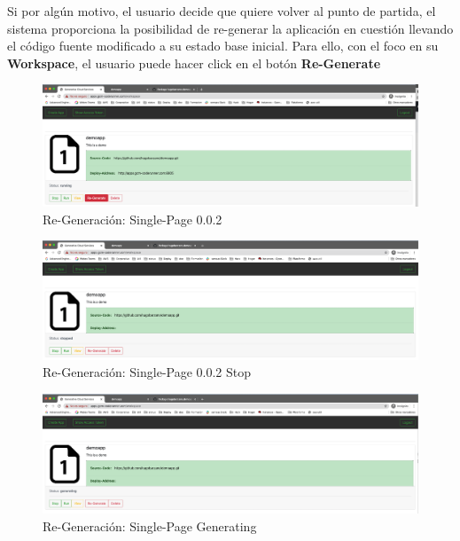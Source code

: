 \documentclass[a4paper,11pt]{book}
\begin{document}
Si por algún motivo, el usuario decide que quiere volver al punto de partida, el sistema proporciona la posibilidad de re-generar la aplicación en cuestión llevando el código fuente modificado a su estado base inicial. Para ello, con el foco en su \textbf{Workspace}, el usuario puede hacer click en el botón \textbf{Re-Generate}

 \begin{figure}[H]
\centering
\includegraphics[scale=0.25]{imagenes/casouso/4_1_a.png}
\caption{  Re-Generación: Single-Page 0.0.2 }
\end{figure}


\begin{figure}[H]
\centering
\includegraphics[scale=0.25]{imagenes/casouso/4_2_a.png}
\caption{  Re-Generación: Single-Page 0.0.2 Stop}
\end{figure}


\begin{figure}[H]
\centering
\includegraphics[scale=0.25]{imagenes/casouso/4_3_a.png}
\caption{ Re-Generación: Single-Page Generating  }
\end{figure}
\end{document}
